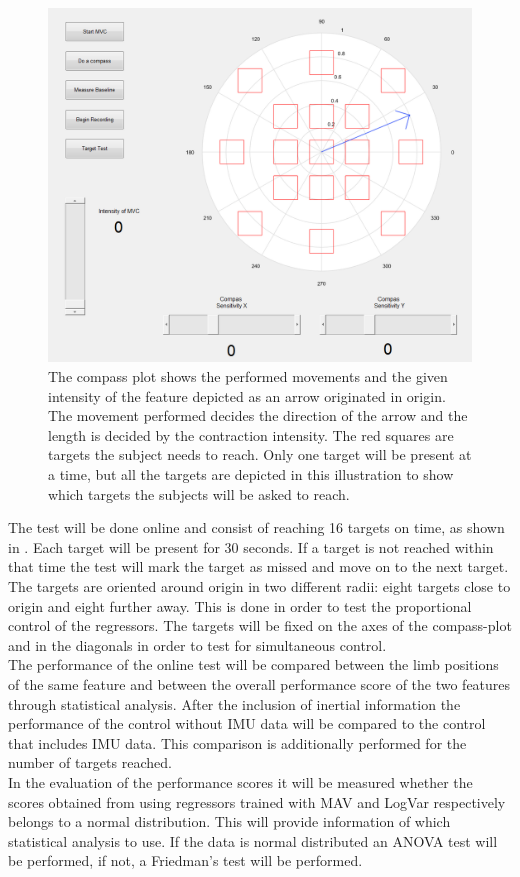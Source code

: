 \begin{figure}[H]
	\includegraphics[width=1\textwidth]{figures/Methods/PlacesToGo.png}  %
	\caption{The compass plot shows the performed movements and the given intensity of the feature depicted as an arrow originated in origin. The movement performed decides the direction of the arrow and the length is decided by the contraction intensity. The red squares are targets the subject needs to reach. Only one target will be present at a time, but all the targets are depicted in this illustration to show which targets the subjects will be asked to reach.}
	\label{fig:PlacesToGo}
\end{figure}

The test will be done online and consist of reaching 16 targets on time, as shown in . Each target will be present for 30 seconds. If a target is not reached within that time the test will mark the target as missed and move on to the next target. The targets are oriented around origin in two different radii: eight targets close to origin and eight further away. This is done in order to test the proportional control of the regressors. The targets will be fixed on the axes of the compass-plot and in the diagonals in order to test for simultaneous control. \\
The performance of the online test will be compared between the limb positions of the same feature and between the overall performance score of the two features through statistical analysis. After the inclusion of inertial information the performance of the control without IMU data will be compared to the control that includes IMU data. This comparison is additionally performed for the number of targets reached. \\
In the evaluation of the performance scores it will be measured whether the scores obtained from using regressors trained with MAV and LogVar respectively belongs to a normal distribution. This will provide information of which statistical analysis to use. If the data is normal distributed an ANOVA test will be performed, if not, a Friedman's test will be performed.


